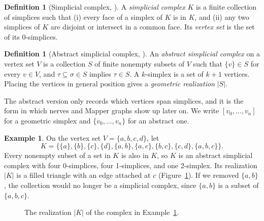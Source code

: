 \documentclass[11pt]{article}
\theoremstyle{definition}
\newtheorem{definition}[theorem]{Definition}
\newtheorem{example}[theorem]{Example}
\theoremstyle{remark}
\begin{document}
\begin{definition}[Simplicial complex, {\cite{edelsbrunnerletscherzomorodian2002}}]
A \emph{simplicial complex} $K$ is a finite collection of simplices such that (i) every face of a simplex of $K$ is in $K$, and (ii) any two simplices of $K$ are disjoint or intersect in a common face.
Its \emph{vertex set} is the set of its 0-simplices.
\end{definition}

\begin{definition}[Abstract simplicial complex, {\cite{zomorodiancarlsson2005}}]
An \emph{abstract simplicial complex} on a vertex set $V$ is a collection $S$ of finite nonempty subsets of $V$ such that $\{v\} \in S$ for every $v \in V$, and $\tau \subseteq \sigma \in S$ implies $\tau \in S$.
A $k$-simplex is a set of $k+1$ vertices. Placing the vertices in general position gives a \emph{geometric realization} $|S|$.
\end{definition}
The abstract version only records which vertices span simplices, and it is the form in which nerves and Mapper graphs show up later on.
We write $[v_0, \dots, v_n]$ for a geometric simplex and $\{v_0, \dots, v_n\}$ for an abstract one.

\begin{example}\label{ex:complex}
On the vertex set $V = \{a, b, c, d\}$, let
\[
  K = \big\{ \{a\}, \{b\}, \{c\}, \{d\}, \{a,b\}, \{a,c\}, \{b,c\}, \{c,d\}, \{a,b,c\} \big\}.
\]
Every nonempty subset of a set in $K$ is also in $K$, so $K$ is an abstract simplicial complex with four 0-simplices, four 1-simplices, and one 2-simplex.
Its realization $|K|$ is a filled triangle with an edge attached at $c$ (Figure~\ref{fig:complex}).
If we removed $\{a,b\}$, the collection would no longer be a simplicial complex, since $\{a,b\}$ is a subset of $\{a,b,c\}$.
\end{example}

\begin{figure}[htbp]
\centering
{}
\caption{The realization $|K|$ of the complex in Example~\ref{ex:complex}.}\label{fig:complex}
\end{figure}
\end{document}
